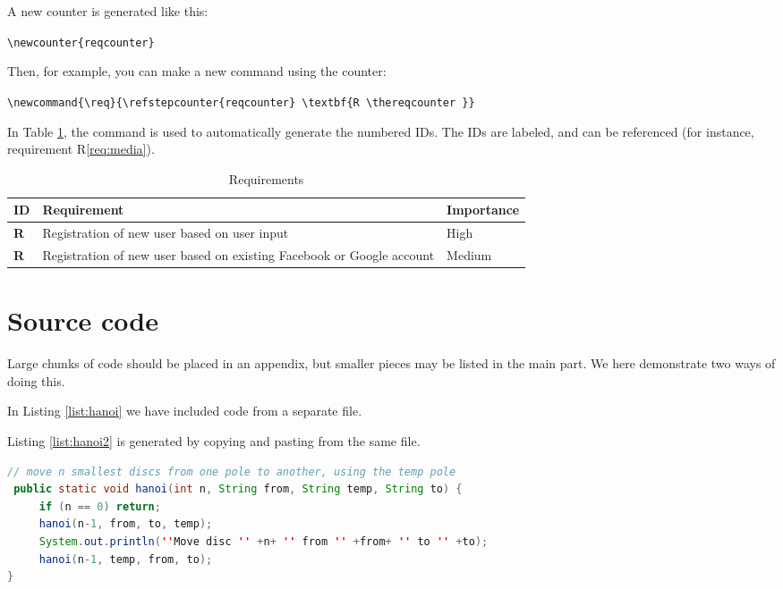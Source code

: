 A new counter is generated like this:

\verb|\newcounter{reqcounter}|

Then, for example, you can make a new command using the counter:

\verb|\newcommand{\req}{\refstepcounter{reqcounter} \textbf{R \thereqcounter }}|

\newcommand{\req}{\refstepcounter{rqcount} \textbf{R\therqcount }}

In Table \ref{tab:requirements}, the command is used to automatically generate the numbered IDs. The IDs are labeled, and can be referenced (for instance, requirement R\ref{req:media}).

\begin{table}[!htbp]
    \begin{center}
        \begin{tabular}{|l|l|l|}
             \hline
             ID & Requirement  & Importance  \\
             \hline \hline
             \req \label{req:register} & Registration of new user based on user input & High \\
             \hline
             \req \label{req:media} & Registration of new user based on existing Facebook or Google account & Medium \\
             \hline
        \end{tabular}
    \end{center}
    \caption{Requirements}
    \label{tab:requirements}
\end{table}


\section{Source code}
\label{sec:sourcecode} 

Large chunks of code should be placed in an appendix, but smaller pieces may be listed in the main part. We here demonstrate two ways of doing this.

In Listing \ref{list:hanoi} we have included code from a separate file.



Listing \ref{list:hanoi2} is generated by copying and pasting from the same file.

\begin{lstlisting}[caption=Core of the recursive solution of Towers of Hanoi,label=list:hanoi2,language=Java,float=htpb]
// move n smallest discs from one pole to another, using the temp pole
 public static void hanoi(int n, String from, String temp, String to) {
     if (n == 0) return;
     hanoi(n-1, from, to, temp);
     System.out.println(''Move disc '' +n+ '' from '' +from+ '' to '' +to);
     hanoi(n-1, temp, from, to);
}
\end{lstlisting}

